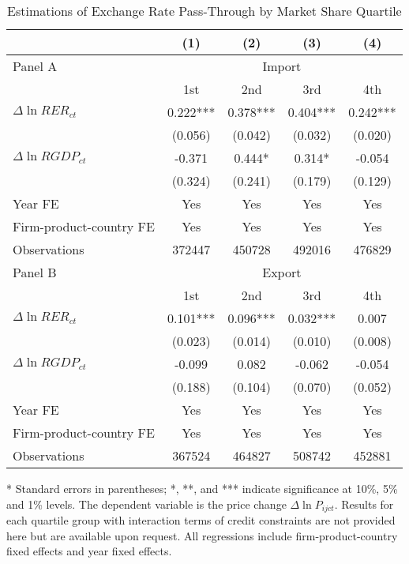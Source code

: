 \begin{table}[htbp]
	\centering
	\caption{Estimations of Exchange Rate Pass-Through by Market Share Quartile}
	\begin{threeparttable}
		\begin{tabular}{lcccc}
			\toprule
			& (1)   & (2)   & (3)   & (4) \\
			\midrule
			Panel A & \multicolumn{4}{c}{Import} \\
			& 1st   & 2nd   & 3rd   & 4th \\
			\midrule
			$\Delta \ln RER_{ct}$ & 0.222*** & 0.378*** & 0.404*** & 0.242*** \\
			& (0.056) & (0.042) & (0.032) & (0.020) \\
			$\Delta \ln RGDP_{ct}$ & -0.371 & 0.444* & 0.314* & -0.054 \\
			& (0.324) & (0.241) & (0.179) & (0.129) \\
			Year FE  & Yes   & Yes   & Yes   & Yes \\
			Firm-product-country FE & Yes   & Yes   & Yes   & Yes \\
			Observations & 372447 & 450728 & 492016 & 476829 \\
			\midrule
			Panel B & \multicolumn{4}{c}{Export} \\
			& 1st   & 2nd   & 3rd   & 4th \\
			\midrule
			$\Delta \ln RER_{ct}$ & 0.101*** & 0.096*** & 0.032*** & 0.007 \\
			& (0.023) & (0.014) & (0.010) & (0.008) \\
			$\Delta \ln RGDP_{ct}$ & -0.099 & 0.082 & -0.062 & -0.054 \\
			& (0.188) & (0.104) & (0.070) & (0.052) \\
			Year FE  & Yes   & Yes   & Yes   & Yes \\
			Firm-product-country FE & Yes   & Yes   & Yes   & Yes \\
			Observations & 367524 & 464827 & 508742 & 452881 \\
			\bottomrule
		\end{tabular}
		\begin{tablenotes}
			\footnotesize
			\item[*] Standard errors in parentheses; *, **, and *** indicate significance at 10\%, 5\% and 1\% levels. The dependent variable is the price change $\Delta \ln P_{ijct}$. Results for each quartile group with interaction terms of credit constraints are not provided here but are available upon request. All regressions include firm-product-country fixed effects and year fixed effects.
		\end{tablenotes}
	\end{threeparttable}
	\label{tab6.3}
\end{table}

